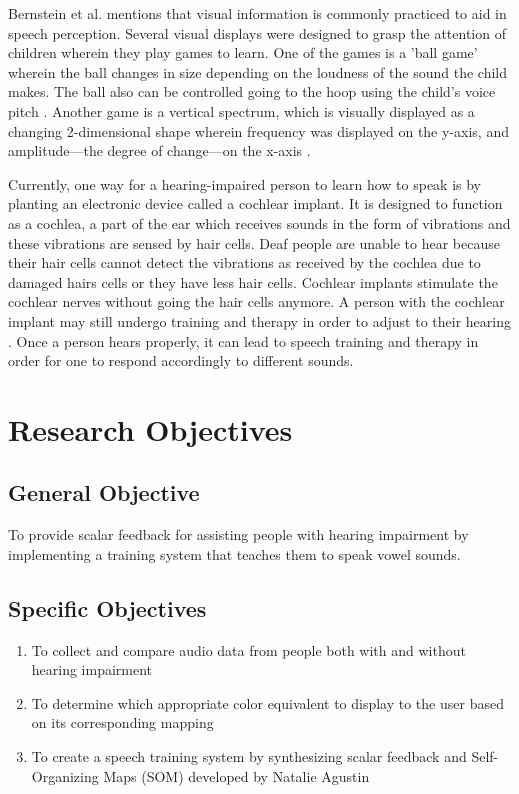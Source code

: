 Bernstein et al. \citeyear{bernstein:1988:STA} mentions that visual information is commonly practiced to aid in speech perception. Several visual displays were designed to grasp the attention of children wherein they play games to learn. One of the games is a 'ball game' wherein the ball changes in size depending on the loudness of the sound the child makes. The ball also can be controlled going to the hoop using the child's voice pitch \cite{bernstein:1988:STA}. Another game is a vertical spectrum, which is visually displayed as a changing 2-dimensional shape wherein frequency was displayed on the y-axis, and amplitude---the degree of change---on the x-axis \cite{bernstein:1988:STA}.

Currently, one way for a hearing-impaired person to learn how to speak is by planting an electronic device called a cochlear implant. It is designed to function as a cochlea, a part of the ear which receives sounds in the form of vibrations and these vibrations are sensed by hair cells. Deaf people are unable to hear because their hair cells cannot detect the vibrations as received by the cochlea due to damaged hairs cells or they have less hair cells. Cochlear implants stimulate the cochlear nerves without going the hair cells anymore. A person with the cochlear implant may still undergo training and therapy in order to adjust to their hearing \cite{blume:2009:AE}. Once a person hears properly, it can lead to speech training and therapy in order for one to respond accordingly to different sounds.

\section{Research Objectives}
\label{sec:researchobjectives}

\subsection{General Objective}
\label{sec:generalobjective}

To provide scalar feedback for assisting people with hearing impairment by implementing a training system that teaches them to speak vowel sounds.

\subsection{Specific Objectives}
\label{sec:specificobjectives}

\begin{enumerate}
\item To collect and compare audio data from people both with and without hearing impairment
\item To determine which appropriate color equivalent to display to the user based on its corresponding mapping
\item To create a speech training system by synthesizing scalar feedback and Self-Organizing Maps (SOM) developed by Natalie Agustin \citeyear{agustin:2014:SOM}
\end{enumerate}

